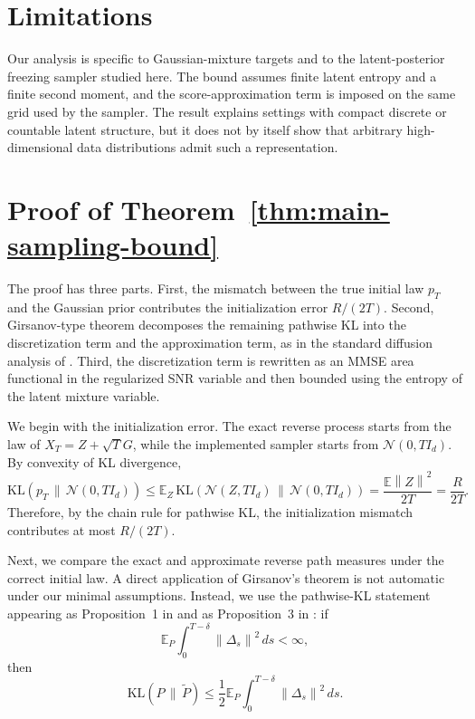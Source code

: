 \documentclass[11pt]{article}
\newcommand{\E}{\mathbb{E}}
\newcommand{\KL}{\mathrm{KL}}
\newcommand{\norm}[1]{\left\lVert #1 \right\rVert}
\begin{document}
\section*{Limitations}
Our analysis is specific to Gaussian-mixture targets and to the latent-posterior
freezing sampler studied here. The bound assumes finite latent entropy and a
finite second moment, and the score-approximation term is imposed on the same
grid used by the sampler. The result explains settings with compact discrete
or countable latent structure, but it does not by itself show that arbitrary
high-dimensional data distributions admit such a representation.

\printbibliography
\appendix

\section{Proof of Theorem~\ref{thm:main-sampling-bound}}\label{app:proof-main}

The proof has three parts. First, the mismatch between the true initial law $p_T$ and the Gaussian prior contributes the initialization error $R/(2T)$. Second, Girsanov-type theorem decomposes the remaining pathwise KL into the discretization term and the approximation term, as in the standard diffusion analysis of \cite{chen2023sampling}. Third, the discretization term is rewritten as an MMSE area functional in the regularized SNR variable and then bounded using the entropy of the latent mixture variable.

We begin with the initialization error. The exact reverse process starts from the law of $X_T=Z+\sqrt T G$, while the implemented sampler starts from $\mathcal N(0,T I_d)$. By convexity of KL divergence,
\[
    \KL(p_T\,\|\,\mathcal N(0,T I_d))
    \le
    \E_Z\,
    \KL\!\left(
    \mathcal N(Z,T I_d)\,\|\,\mathcal N(0,T I_d)
    \right)
    =
    \frac{\E\norm{Z}^2}{2T}
    =
    \frac{R}{2T}.
\]
Therefore, by the chain rule for pathwise KL, the initialization mismatch
contributes at most \(R/(2T)\).

Next, we compare the exact and approximate reverse path measures under the
correct initial law. A direct application of Girsanov's theorem is not
automatic under our minimal assumptions. Instead, we use the pathwise-KL
statement appearing as Proposition~1 in \cite{aghapour2026entropy} and as
Proposition~3 in \cite{benton2024nearly}: if
\[
    \E_P\int_0^{T-\delta}\norm{\Delta_s}^2\,ds<\infty,
\]
then
\[
    \KL(P\,\|\,\widetilde P)
    \le
    \frac12
    \E_P\int_0^{T-\delta}\norm{\Delta_s}^2\,ds .
\]
\end{document}
